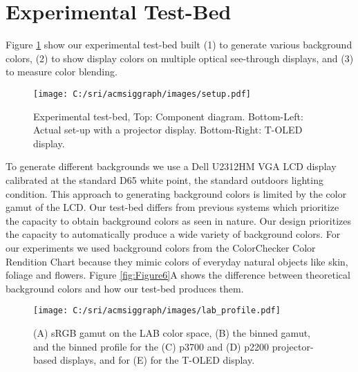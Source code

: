 \documentclass[annual]{acmsiggraph}
\begin{document}
\section{Experimental Test-Bed}

Figure \ref{fig:Figure4} show our experimental test-bed built (1) to generate various background colors, (2) to show display colors on multiple optical see-through displays, and (3) to measure color blending.
\begin{figure}[ht]
  \centering
  \texttt{[image: C:/sri/acmsiggraph/images/setup.pdf]}
  \caption{Experimental test-bed, Top: Component diagram. Bottom-Left: Actual set-up with a projector display. Bottom-Right: T-OLED display.}
  \label{fig:Figure4}
\end{figure}

To generate different backgrounds we use a Dell U2312HM VGA LCD display calibrated at the standard D65 white point, the standard outdoors lighting condition. This approach to generating background colors is limited by the color gamut of the LCD. Our test-bed differs from previous systems \cite{Gabbard:2010} which prioritize the capacity to obtain background colors as seen in nature. Our design prioritizes the capacity to automatically produce a wide variety of background colors. For our experiments we used background colors from the ColorChecker Color Rendition Chart  because they mimic colors of everyday natural objects like skin, foliage and flowers. Figure \ref{fig:Figure6}A shows the difference between theoretical background colors and how our test-bed produces them.
\begin{figure*}[ht]
  \centering
  \texttt{[image: C:/sri/acmsiggraph/images/lab\_profile.pdf]}
  \caption{(A) sRGB gamut on the LAB color space, (B) the binned gamut, and the binned profile for the (C) p3700 and (D) p2200 projector-based displays, and for (E) for the T-OLED display.}
  \label{fig:Figure5}
  \end{figure*}
\end{document}
